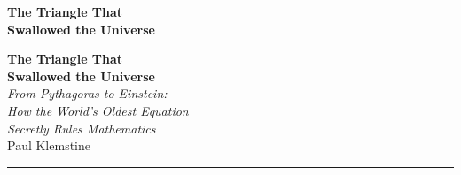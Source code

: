\documentclass[11pt,twoside,openright]{book}
\theoremstyle{definition}
\theoremstyle{remark}
\begin{document}
\frontmatter

\thispagestyle{empty}
\vspace*{\fill}
\begin{center}
  {\Huge\bfseries\color{MidnightBlue} The Triangle That\\[0.3em] Swallowed the Universe}
\end{center}
\vspace*{\fill}
\clearpage

\thispagestyle{empty}
\mbox{}
\clearpage

\thispagestyle{empty}
\vspace*{1.5in}
\begin{center}
  {\fontsize{32}{38}\selectfont\bfseries\color{MidnightBlue} The Triangle That\\[0.4em] Swallowed the Universe}\\[1.5em]
  {\Large\itshape From Pythagoras to Einstein:\\[0.3em]
  How the World's Oldest Equation\\[0.3em]
  Secretly Rules Mathematics}\\[3em]
  {\LARGE Paul Klemstine}\\[4em]
  \rule{2in}{0.5pt}
\end{center}
\vspace*{\fill}
\clearpage
\end{document}
